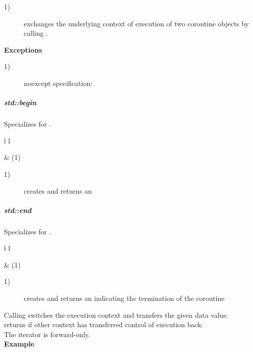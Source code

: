 \begin{description}
    \item[1)] exchanges the underlying context of execution of two coroutine
              objects by calling . 
\end{description}

{\bf Exceptions}
\begin{description}
    \item[1)] noexcept specification: 
\end{description}

\subparagraph*{std::begin}
Specializes  for \pushcoro.

\begin{tabular}{ l l }
    \midrule

     & (1)\\

    \midrule
\end{tabular}

\begin{description}
    \item[1)] creates and returns an 
\end{description}

\subparagraph*{std::end}
Specializes  for \pushcoro.

\begin{tabular}{ l l }
    \midrule

     & (1)\\

    \midrule
\end{tabular}

\begin{description}
    \item[1)] creates and returns an  indicating the termination of the coroutine
\end{description}

Calling  switches the execution context and transfers the given data value.\\
 returns if other context has transferred control of execution back.\\
The iterator is forward-only.\\

{\bf Example}

